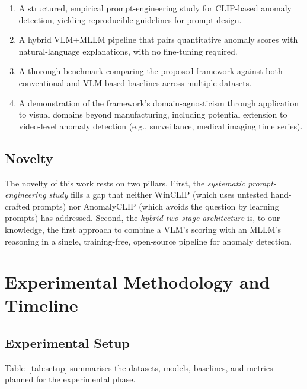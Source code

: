 \documentclass[conference]{IEEEtran}
\begin{document}
\begin{enumerate}[leftmargin=*, itemsep=3pt]
    \item A structured, empirical prompt-engineering study for CLIP-based anomaly detection, yielding reproducible guidelines for prompt design.
    \item A hybrid VLM+MLLM pipeline that pairs quantitative anomaly scores with natural-language explanations, with no fine-tuning required.
    \item A thorough benchmark comparing the proposed framework against both conventional and VLM-based baselines across multiple datasets.
    \item A demonstration of the framework's domain-agnosticism through application to visual domains beyond manufacturing, including potential extension to video-level anomaly detection (e.g., surveillance, medical imaging time series).
\end{enumerate}

\subsection{Novelty}

The novelty of this work rests on two pillars. First, the \textit{systematic prompt-engineering study} fills a gap that neither WinCLIP (which uses untested hand-crafted prompts) nor AnomalyCLIP (which avoids the question by learning prompts) has addressed. Second, the \textit{hybrid two-stage architecture} is, to our knowledge, the first approach to combine a VLM's scoring with an MLLM's reasoning in a single, training-free, open-source pipeline for anomaly detection.

\section{Experimental Methodology and Timeline}

\subsection{Experimental Setup}

Table~\ref{tab:setup} summarises the datasets, models, baselines, and metrics planned for the experimental phase.
\end{document}
